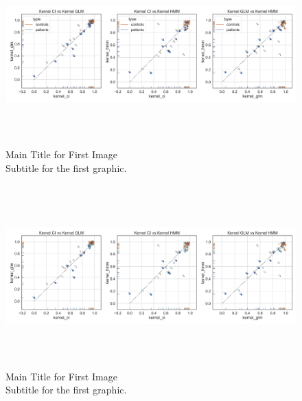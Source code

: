 \begin{figure}[H]
    \centering
    \includegraphics[width=17cm,height=7cm]{MainLayout/Images/chapter8/kernel_comparison_methods.jpg}
    \caption{Main Title for First Image \\ \small Subtitle for the first graphic.}
    \label{fig:kernel_comparison_methods}
\end{figure}
\begin{figure}[H]
    \centering
    \includegraphics[width=17cm,height=7cm]{MainLayout/Images/chapter8/kernel_comparison_types_methods.jpg}
    \caption{Main Title for First Image \\ \small Subtitle for the first graphic.}
    \label{fig:kernel_comparison_methods}
\end{figure}
